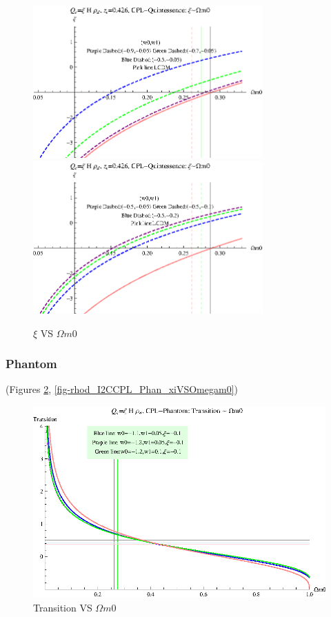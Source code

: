 \documentclass[12pt,a4paper]{article}
\begin{document}
\begin{figure}
\centering
\includegraphics[width=250pt]{rhod_I2CCPL_Quint_xiVSOmegam01.eps}
\includegraphics[width=250pt]{rhod_I2CCPL_Quint_xiVSOmegam02.eps}
\caption{$\xi$ VS $\Omega m0$}\label{fig-rhod_I2CCPL_Quint_xiVSOmegam0}
\end{figure}






\subsubsection{Phantom}

(Figures \ref{fig-rhod_I2CCPL_Phan_TransVSOmegam0}, \ref{fig-rhod_I2CCPL_Phan_xiVSOmegam0})



\begin{figure}
\centering
\includegraphics[width=500pt]{rhod_I2CCPL_Phan_TransVSOmegam0.eps}
\caption{Transition VS $\Omega m0$}\label{fig-rhod_I2CCPL_Phan_TransVSOmegam0}
\end{figure}
\end{document}

